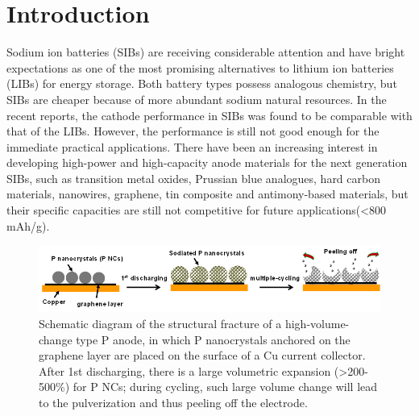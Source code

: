 \section{Introduction}
Sodium ion batteries (SIBs) are receiving considerable attention and have bright expectations as one of the most promising alternatives to lithium ion batteries (LIBs) for energy storage.\cite{Ren2014,Yang2011c,Liu2014a,Wen2014b,Shen2015b,wang2014e,Wu2014b,Yao2015b,Ni2014b} Both battery types possess analogous chemistry, but SIBs are cheaper because of more abundant sodium natural resources. In the recent reports, the cathode performance in SIBs was found to be comparable with that of the LIBs.\cite{Sun2014b,Barpanda2014b} However, the performance is still not good enough for the immediate practical applications. There have been an increasing interest in developing high-power and high-capacity anode materials for the next generation SIBs,\cite{Ong2011b,Palomares2012b,Zhu2014b,Yu2014b,Berthelot2011b,Qian2012d,Wang2013g,Komaba2011b,Cao2012b,Wang2013h,Xu2013b,Qian2012e} such as transition metal oxides\cite{Zhu2014b,Yu2014b,Berthelot2011b}, Prussian blue analogues\cite{Qian2012d,Wang2013g}, hard carbon materials\cite{Komaba2011b}, nanowires\cite{Cao2012b}, graphene\cite{Wen2014b,Wang2013h}, tin composite\cite{Xu2013b} and antimony-based materials\cite{Qian2012e}, but their specific capacities are still not competitive for future applications(<800 mAh/g). \\

\begin{figure}  
\includegraphics[width=\textwidth]{figures/figure4_s1}
\caption[Peeling off after cycling]
{Schematic diagram of the structural fracture of a high-volume-change type P anode, in which P nanocrystals anchored on the graphene layer are placed on the surface of a Cu current collector. After 1st discharging, there is a large volumetric expansion (>200-500\%) for P NCs; during cycling, such large volume change will lead to the pulverization and thus peeling off the electrode.
\label{fig:4_s1}}
\end{figure}

